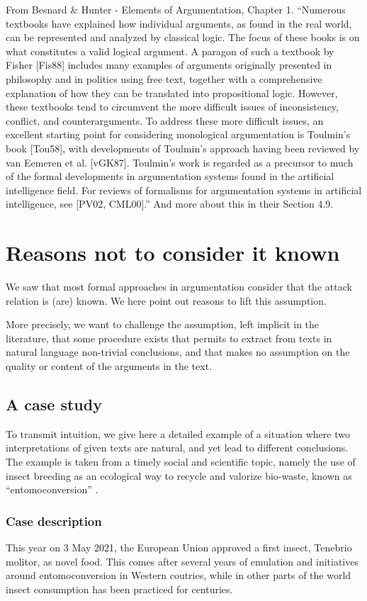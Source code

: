 \documentclass[version=3.21, pagesize, twoside=off, bibliography=totoc, DIV=calc, fontsize=12pt, a4paper, french, english]{scrartcl}
\begin{document}
From Besnard \& Hunter - Elements of Argumentation, Chapter 1. “Numerous textbooks have explained how individual arguments, as found in the real world, can be represented and analyzed by classical logic. The focus of these books is on what constitutes a valid logical argument. A paragon of such a textbook by Fisher [Fis88] includes many examples of arguments originally presented in philosophy and in politics using free text, together with a comprehensive explanation of how they can be translated into propositional logic. However, these textbooks tend to circumvent the more difficult issues of inconsistency, conflict, and counterarguments.
To address these more difficult issues, an excellent starting point for considering monological argumentation is Toulmin’s book [Tou58], with developments of Toulmin’s approach having been reviewed by van Eemeren et al. [vGK87]. Toulmin’s work is regarded as a precursor to much of the formal developments in argumentation systems found in the artificial intelligence field. For reviews of formalisms for argumentation systems in artificial intelligence, see [PV02, CML00].” And more about this in their Section 4.9.

\section{Reasons not to consider it known}
We saw that most formal approaches in argumentation consider that the attack relation is (are) known. 
We here point out reasons to lift this assumption.

More precisely, we want to challenge the assumption, left implicit in the literature, that some procedure exists that permits to extract from texts in natural language non-trivial conclusions, and that makes no assumption on the quality or content of the arguments in the text.

\subsection{A case study}
To transmit intuition, we give here a detailed example of a situation where 
two interpretations of given texts are natural, and yet lead to different 
conclusions. The example is taken from a timely social and scientific topic, namely the use of insect breeding as an ecological way to recycle and valorize bio-waste, known as ``entomoconversion'' \citep{FAO2021,Kialo2019}.

\subsubsection{Case description}
This year on 3 May 2021, the European Union approved a first insect, Tenebrio molitor, as novel food. This comes after several years of emulation and initiatives around entomoconversion in Western coutries, while in other parts of the world insect consumption has been practiced for centuries.
\end{document}
